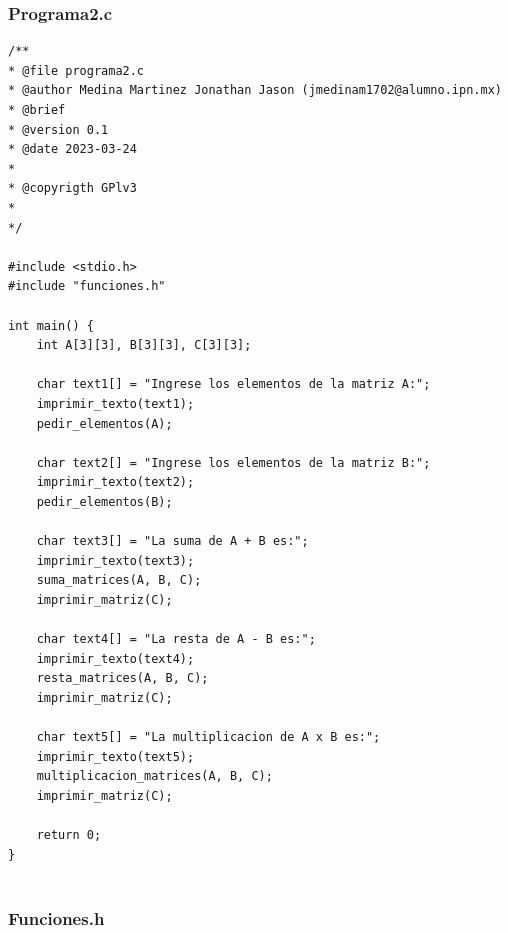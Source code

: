 \documentclass{article}
\begin{document}
	\subsubsection{Programa2.c}
	
	\begin{lstlisting}
/**
* @file programa2.c
* @author Medina Martinez Jonathan Jason (jmedinam1702@alumno.ipn.mx)
* @brief 
* @version 0.1
* @date 2023-03-24
* 
* @copyrigth GPlv3
* 
*/

#include <stdio.h>
#include "funciones.h"

int main() {
	int A[3][3], B[3][3], C[3][3];
	
	char text1[] = "Ingrese los elementos de la matriz A:";
	imprimir_texto(text1);
	pedir_elementos(A);

	char text2[] = "Ingrese los elementos de la matriz B:";
	imprimir_texto(text2);
	pedir_elementos(B);

	char text3[] = "La suma de A + B es:";
	imprimir_texto(text3);
	suma_matrices(A, B, C);
	imprimir_matriz(C);

	char text4[] = "La resta de A - B es:";
	imprimir_texto(text4);
	resta_matrices(A, B, C);
	imprimir_matriz(C);

	char text5[] = "La multiplicacion de A x B es:";
	imprimir_texto(text5);
	multiplicacion_matrices(A, B, C);
	imprimir_matriz(C);

	return 0;
}
	
	\end{lstlisting}
	
	\subsubsection{Funciones.h}
	
\end{document}
